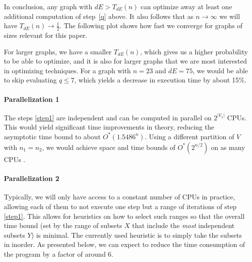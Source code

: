 \documentclass[a4paper]{article}
\begin{document}
In conclusion, any graph with $dE > T_{dE}(n)$ can optimize away at least one additional computation of step~\ref{q} above. It also follows that as $n \rightarrow \infty$ we will have $T_{dE}(n) \rightarrow \frac{1}{2}$. The following plot shows how fast we converge for graphs of sizes relevant for this paper.

\begin{center}
\end{center}
For larger graphs, we have a smaller $T_{dE}(n)$, which gives us a higher probability to be able to optimize, and it is also for larger graphs that we are most interested in optimizing techniques. For a graph with $n=23$ and $dE = 75$, we would be able to skip evaluating $q\leq7$, which yields a decrease in execution time by about 15\%\footnotemark. %


\paragraph{Parallelization 1} The steps \ref{step1} are independent and can be computed in parallel on $2^{|V_1|}$ CPUs. This would yield significant time improvements in theory, reducing the asymptotic time bound to about $O^*(1.5486^n)$. Using a different partition of $V$ with $n_1 = n_2$, we would achieve space and time bounds of $O^*(2^{n/2})$ on as many CPUs \cite{cov_pack}.

\paragraph{Parallelization 2} Typically, we will only have access to a constant number of CPUs in practice, allowing each of them to not execute one step but a range of iterations of step \ref{step1}. This allows for heuristics on how to select such ranges so that the overall time bound (set by the range of subsets $X$ that include the \emph{most} independent subsets $Y$) is minimal. The currently used heuristic is to simply take the subsets in inorder. As presented below, we can expect to reduce the time consumption of the program by a factor of around 6. %
\end{document}
